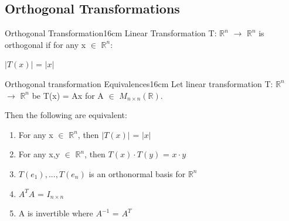 \subsection{ Orthogonal Transformations }

    \begin{definition}{Orthogonal Transformation}{16cm}
        Linear Transformation T: $\mathbb{R}^n$ $\rightarrow$ $\mathbb{R}^n$
        is {\color{lblue} orthogonal} if for any x $\in$ $\mathbb{R}^n$:

        \hspace{0.5cm}
        $|T(x)|$ = $|x|$
    \end{definition}

    \vspace{0.5cm}

    

    \begin{wtheorem}{Orthogonal transformation Equivalences}{16cm}
        Let linear transformation T: $\mathbb{R}^n$ $\rightarrow$ $\mathbb{R}^n$
        be T(x) = Ax for A $\in$ $M_{n \times n}(\mathbb{R})$.

        Then the following are equivalent:

        \begin{enumerate}[label=(\alph*), leftmargin=1cm, itemsep=0.1cm]
            \item For any x $\in$ $\mathbb{R}^n$, then
                $|T(x)|$ = $|x|$

            \item For any x,y $\in$ $\mathbb{R}^n$, then
                $T(x) \cdot T(y)$ = $x \cdot y$

            \item $T(e_1),...,T(e_n)$ is an orthonormal basis for $\mathbb{R}^n$
            
            \item $A^TA$ = $I_{n \times n}$
            
            \item A is invertible where $A^{-1}$ = $A^T$
        \end{enumerate}
    \end{wtheorem}

